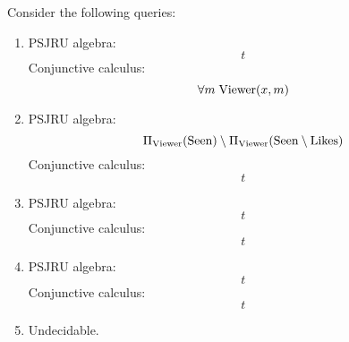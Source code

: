 \documentclass{../../cs-classes/cs-classes}
\newcommand*{\seen}{\textnormal{Seen}}
\newcommand*{\likes}{\textnormal{Likes}}
\newcommand*{\viewer}{\textnormal{Viewer}}
\begin{document}
\begin{exercise}
    Consider the following queries:
  \begin{enumerate}
    \item PSJRU algebra:
    \begin{equation*}
        t
    \end{equation*}
    Conjunctive calculus:
    \begin{equation*}
        \forall m \; \viewer(x, m)
    \end{equation*}
    
    \item PSJRU algebra:
    \begin{equation*}
        \Pi_{\viewer}(\seen)\setminus\Pi_{\viewer}(\seen\setminus\likes)
    \end{equation*}
    Conjunctive calculus:
    \begin{equation*}
        t
    \end{equation*}
    
    \item PSJRU algebra:
    \begin{equation*}
        t
    \end{equation*}
    Conjunctive calculus:
    \begin{equation*}
        t
    \end{equation*}
    
    \item PSJRU algebra:
    \begin{equation*}
        t
    \end{equation*}
    Conjunctive calculus:
    \begin{equation*}
        t
    \end{equation*}
    
    \item Undecidable.

  \end{enumerate}  
\end{exercise}
\end{document}
